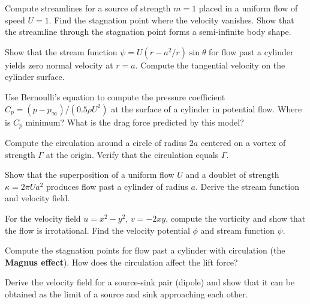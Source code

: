 \begin{exercise}
Compute streamlines for a source of strength $m=1$ placed in a uniform flow of speed $U=1$.
Find the stagnation point where the velocity vanishes. Show that the streamline through the
stagnation point forms a semi-infinite body shape.
\end{exercise}

\begin{exercise}
Show that the stream function $\psi = U(r - a^2/r)\sin\theta$ for flow past a cylinder yields
zero normal velocity at $r=a$. Compute the tangential velocity on the cylinder surface.
\end{exercise}

\begin{exercise}
Use Bernoulli's equation to compute the pressure coefficient $C_p = (p - p_\infty)/(0.5\rho U^2)$
at the surface of a cylinder in potential flow. Where is $C_p$ minimum? What is the drag
force predicted by this model?
\end{exercise}

\begin{exercise}
Compute the circulation around a circle of radius $2a$ centered on a vortex of strength $\Gamma$
at the origin. Verify that the circulation equals $\Gamma$.
\end{exercise}

\begin{exercise}
Show that the superposition of a uniform flow $U$ and a doublet of strength $\kappa = 2\pi U a^2$
produces flow past a cylinder of radius $a$. Derive the stream function and velocity field.
\end{exercise}

\begin{exercise}
For the velocity field $u = x^2 - y^2$, $v = -2xy$, compute the vorticity and show that
the flow is irrotational. Find the velocity potential $\phi$ and stream function $\psi$.
\end{exercise}

\begin{exercise}
Compute the stagnation points for flow past a cylinder with circulation (the \textbf{Magnus effect}).
How does the circulation affect the lift force?
\end{exercise}

\begin{exercise}
Derive the velocity field for a source-sink pair (dipole) and show that it can be obtained
as the limit of a source and sink approaching each other.
\end{exercise}

